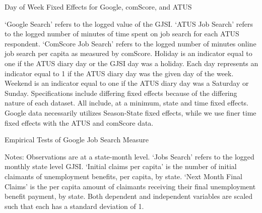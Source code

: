 \documentclass[12pt]{article}
\begin{document}
\begin{spacing}{2}
\begin{sidewaystable}[H]
\caption{Day of Week Fixed Effects for Google, comScore, and ATUS}
\label{tab:dayofweek}
\begin{center}

\begin{tablenotes}
\item  `Google Search' refers to the logged value of the GJSI. `ATUS Job Search' refers to the logged number of minutes of time spent on job search for each ATUS respondent. `ComScore Job Search' refers to the logged number of minutes online job search per capita as measured by comScore. Holiday is an indicator equal to one if the ATUS diary day or the GJSI day was a holiday. Each day represents an indicator equal to 1 if the ATUS diary day was the given day of the week. Weekend is an indicator equal to one if the ATUS diary day was a Saturday or Sunday. Specifications include differing fixed effects because of the differing nature of each dataset. All include, at a minimum, state and time fixed effects. Google data necessarily utilizes Season-State fixed effects, while we use finer time fixed effects with the ATUS and comScore data.
\end{tablenotes}
\end{center}
\end{sidewaystable}

\begin{sidewaystable}[H]
\caption{Empirical Tests of Google Job Search Measure}
\label{tab:macroeffects}
\begin{center}

\begin{tablenotes}
\item Notes: Observations are at a state-month level. `Jobs Search' refers to the logged monthly state level GJSI. `Initial claims per capita’ is the number of initial claimants of unemployment benefits, per capita, by state. `Next Month Final Claims' is the per capita amount of claimants receiving their final unemployment benefit payment, by state. Both dependent and independent variables are scaled such that each has a standard deviation of 1.
\end{tablenotes}
\end{center}
\end{sidewaystable}


\end{spacing}
\end{document}
